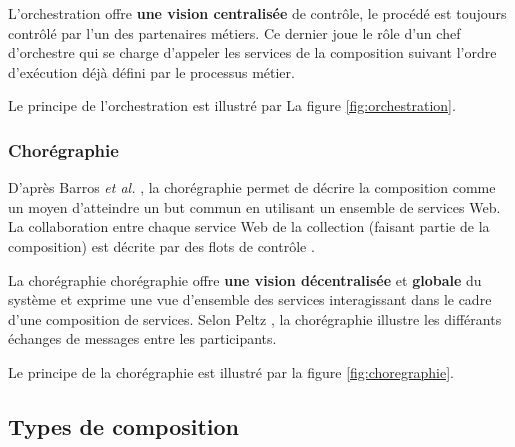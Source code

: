       L'orchestration offre \textbf{une vision centralisée} de
      contrôle, le procédé est toujours contrôlé par l'un des
      partenaires métiers. Ce dernier joue le rôle d'un chef
      d'orchestre qui se charge d'appeler les services de la
      composition suivant l'ordre d'exécution déjà défini par le
      processus métier.
      
      Le principe de l'orchestration est illustré par La figure
      \ref{fig:orchestration}.    

      \subsubsection{Chorégraphie}
      \label{sec:choregraphie-sec}

      D'après Barros \emph{et al.} \cite{barros2006standards}, la
      chorégraphie permet de décrire la composition comme un moyen
      d'atteindre un but commun en utilisant un ensemble de services
      Web. La collaboration entre chaque service Web de la collection
      (faisant partie de la composition) est décrite par des flots de
      contrôle \cite{lopez2008selection}.

      La chorégraphie chorégraphie offre \textbf{une vision
        décentralisée} et \textbf{globale} du système et exprime une
      vue d'ensemble des services interagissant dans le cadre d'une
      composition de services. Selon Peltz \cite{peltz2003web}, la
      chorégraphie illustre les différants échanges de messages entre
      les participants.

      Le principe de la chorégraphie est illustré par la figure
      \ref{fig:choregraphie}.      

     
    \subsection{Types de composition}
    \label{sec:types-de-composition}


